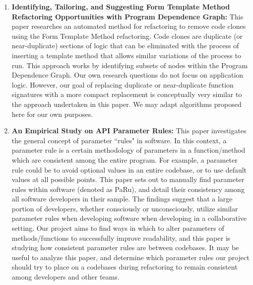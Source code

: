 \documentclass{article}
\begin{document}
\begin{enumerate}
    \item \textbf{Identifying, Tailoring, and Suggesting Form Template Method Refactoring Opportunities with Program Dependence Graph:} This paper\cite{6178876} researches an automated method for refactoring to remove code clones using the Form Template Method refactoring. Code clones are duplicate (or near-duplicate) sections of logic that can be eliminated with the process of inserting a template method that allows similar variations of the process to run. This approach works by identifying subsets of nodes within the Program Dependence Graph. Our own research questions do not focus on application logic. However, our goal of replacing duplicate or near-duplicate function signatures with a more compact replacement is conceptually very similar to the approach undertaken in this paper. We may adapt algorithms proposed here for our own purposes.
  \item \textbf{An Empirical Study on API Parameter Rules:} This paper\cite{10.1145/3377811.3380922} investigates the general concept of parameter ``rules" in software. In this context, a parameter rule is a certain methodology of parameters in a function/method which are consistent among the entire program. For example, a parameter rule could be to avoid optional values in an entire codebase, or to use default values at all possible points. This paper sets out to manually find parameter rules within software (denoted as PaRu), and detail their consistency among all software developers in their sample. The findings suggest that a large portion of developers, whether consciously or unconsciously, utilize similar parameter rules when developing software when developing in a collaborative setting. Our project aims to find ways in which to alter parameters of methods/functions to successfully improve readability, and this paper is studying how consistent parameter rules are between codebases. It may be useful to analyze this paper, and determine which parameter rules our project should try to place on a codebases during refactoring to remain consistent among developers and other teams.

\end{enumerate}
\end{document}
